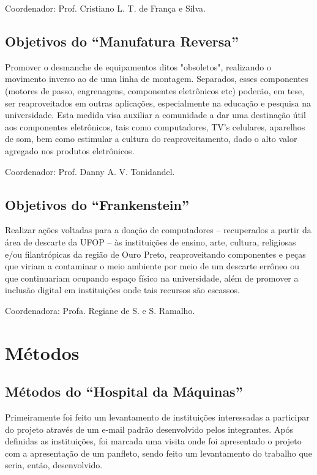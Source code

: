 \documentclass[
	12pt,				%
	openright,			%
	oneside,			%
	a4paper,			%
	english,			%
	spanish,			%
	brazil,				%
	]{abntex2}
\begin{document}
Coordenador: Prof. Cristiano L. T. de França e Silva.

\section{Objetivos do ``Manufatura Reversa''}
Promover o desmanche de equipamentos ditos "obsoletos", realizando o movimento inverso ao de uma linha de montagem. Separados, esses componentes (motores de passo, engrenagens, componentes eletrônicos etc) poderão, em tese, ser reaproveitados em outras aplicações, especialmente na educação e pesquisa na universidade. Esta medida visa auxiliar a comunidade a dar uma destinação útil aos componentes eletrônicos, tais como computadores, TV's celulares, aparelhos de som, bem como estimular a cultura do reaproveitamento, dado o alto valor agregado nos produtos eletrônicos.

Coordenador: Prof. Danny A. V. Tonidandel.

\section{Objetivos do ``Frankenstein''}
Realizar ações voltadas para a doação de computadores – recuperados a partir da área de descarte da UFOP – às instituições de ensino, arte, cultura, religiosas e/ou filantrópicas da região de Ouro Preto,  reaproveitando componentes e peças que viriam a contaminar o meio ambiente por meio de um descarte errôneo ou que continuariam ocupando espaço físico na universidade, além de promover a inclusão digital em instituições onde tais recursos são escassos.

Coordenadora: Profa. Regiane de S. e S. Ramalho.



\chapter{Métodos}

\section{Métodos do ``Hospital da Máquinas''}

Primeiramente foi feito um levantamento de instituições interessadas a participar do projeto através de um e-mail padrão desenvolvido pelos integrantes. Após definidas as instituições, foi marcada uma visita onde foi apresentado o projeto com a apresentação de um panfleto, sendo feito um levantamento do trabalho que seria, então, desenvolvido.
\end{document}
